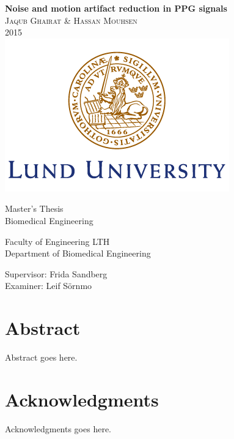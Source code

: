 \documentclass{report}
\begin{document}
\begin{titlepage}
    \begin{center}
       
        \textbf{\huge Noise and motion artifact reduction in PPG signals}
\\
\vspace{1cm}
\large \textsc{Jaqub Ghairat \& Hassan Mouhsen}
\\
\vspace{0.5cm}
2015
\\
\vspace{1cm}
\includegraphics[width=.4\textwidth]{lundlogo.png}


\vspace{1cm}
\LARGE Master's Thesis
\\
\LARGE Biomedical Engineering

\vspace{1.5cm}

\large Faculty of Engineering LTH 
\\
Department of Biomedical Engineering

\vspace{1cm}
Supervisor: Frida Sandberg
\\
\vspace{0.2cm}
Examiner: Leif Sörnmo

    \end{center}
\end{titlepage}




\newpage
\section*{\Huge{Abstract}}
Abstract goes here.
\setcounter{page}{2}
\thispagestyle{plain}

\newpage
\section*{\Huge{Acknowledgments}}
Acknowledgments goes here.
\thispagestyle{plain}


  \tableofcontents
\end{document}
